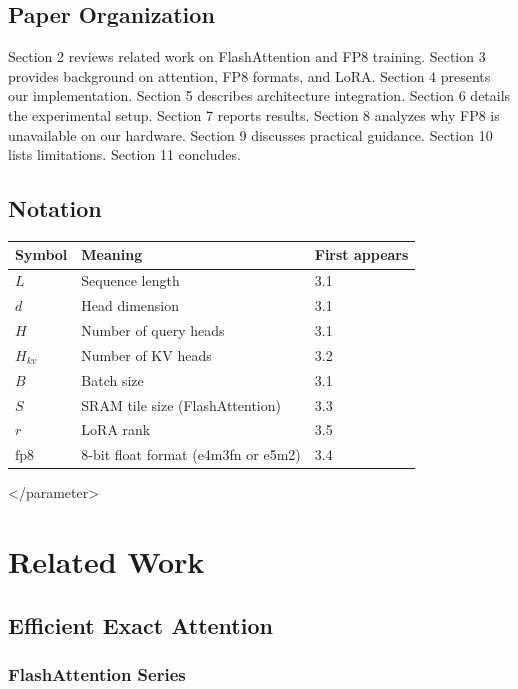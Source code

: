 \subsection{Paper Organization}

Section 2 reviews related work on FlashAttention and FP8 training. Section 3 
provides background on attention, FP8 formats, and LoRA. Section 4 presents 
our implementation. Section 5 describes architecture integration. Section 6 
details the experimental setup. Section 7 reports results. Section 8 
analyzes why FP8 is unavailable on our hardware. Section 9 discusses 
practical guidance. Section 10 lists limitations. Section 11 concludes.



\subsection{Notation}

\begin{table}[H]
\centering
\small
\begin{tabular}{lll}
\toprule
\textbf{Symbol} & \textbf{Meaning} & \textbf{First appears} \\
\midrule
$L$ & Sequence length & 3.1 \\
$d$ & Head dimension & 3.1 \\
$H$ & Number of query heads & 3.1 \\
$H_{kv}$ & Number of KV heads & 3.2 \\
$B$ & Batch size & 3.1 \\
$S$ & SRAM tile size (FlashAttention) & 3.3 \\
$r$ & LoRA rank & 3.5 \\
$\text{fp8}$ & 8-bit float format (e4m3fn or e5m2) & 3.4 \\
\bottomrule
\end{tabular}
\end{table}
</parameter>




\section{Related Work}

\subsection{Efficient Exact Attention}

\subsubsection{FlashAttention Series}

